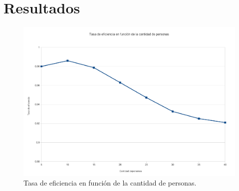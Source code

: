 \section{Resultados}


\begin{figure}[H]{}
\centering
\includegraphics[scale=0.5]{graphs/CPvsTE.pdf}
\caption{Tasa de eficiencia en función de la cantidad de personas.}
\label{CPvsTE}
\end{figure}

